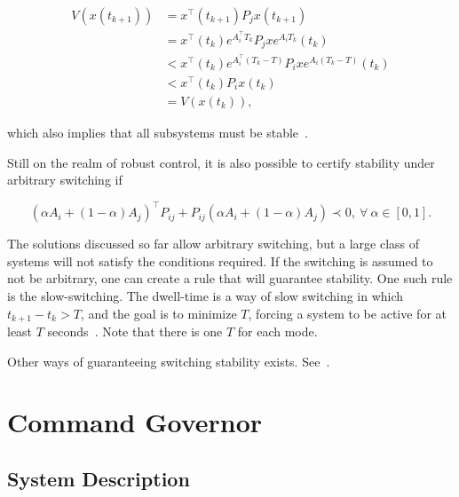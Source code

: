 \begin{align}
  V(x(t_{k+1})) & = x^{\top}(t_{k+1})P_{j}x(t_{k+1})                                        \\
                & = x^{\top}(t_{k})e^{A^{\top}_{i}T_{k}}P_{j}xe^{A_{i}T_{k}}(t_{k})         \\
                & < x^{\top}(t_{k})e^{A^{\top}_{i}(T_{k}-T)}P_{i}xe^{A_{i}(T_{k}-T)}(t_{k}) \\
                & < x^{\top}(t_{k})P_{i}x(t_{k})                                            \\
                & = V(x(t_{k})),
\end{align}

which also implies that all subsystems must be
stable~\parencite{geromel.colaneri:stabilization}.

Still on the realm of robust control, it is also possible to certify stability
under arbitrary switching if~\parencite{liberzon.morse:basic}

\begin{equation}
  (\alpha{}A_{i}+(1-\alpha)A_{j})^{\top}P_{ij}+P_{ij}(\alpha{}A_{i}+(1-\alpha)A_{j}) \prec{} 0,~\forall{}~\alpha{}\in{}[0,1].
\end{equation}

The solutions discussed so far allow arbitrary switching, but a large class of
systems will not satisfy the conditions required. If the switching is assumed to
not be arbitrary, one can create a rule that will guarantee stability. One such
rule is the slow-switching. The dwell-time is a way of slow switching in which
\(t_{k+1}-t_{k}>T\), and the goal is to minimize \(T\), forcing a system to be
active for at least \(T\)
seconds~\parencite{chesi.colaneri.ea:computing,franzè.lucia.ea:command,liberzon.morse:basic}.
Note that there is one \(T\) for each mode.

Other ways of guaranteeing switching stability exists.
See~\textcite{geromel.deaecto:stability,liberzon.morse:basic,geromel.colaneri:stabilization}.

\section{Command Governor}%
\label{sec:command-governor}

\subsection{System Description}%
\label{subsec:system-description}

